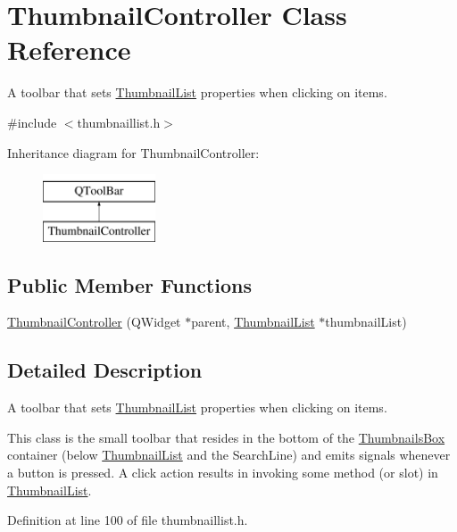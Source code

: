 \hypertarget{classThumbnailController}{\section{Thumbnail\+Controller Class Reference}
\label{classThumbnailController}
}


A toolbar that sets \hyperlink{classThumbnailList}{Thumbnail\+List} properties when clicking on items.  




{\ttfamily \#include $<$thumbnaillist.\+h$>$}

Inheritance diagram for Thumbnail\+Controller\+:\begin{figure}[H]
\begin{center}
\leavevmode
\includegraphics[height=2.000000cm]{classThumbnailController}
\end{center}
\end{figure}
\subsection*{Public Member Functions}
\begin{DoxyCompactItemize}
\item 
\hyperlink{classThumbnailController_a3e7a753f6d179134aaa9897371f95d12}{Thumbnail\+Controller} (Q\+Widget $\ast$parent, \hyperlink{classThumbnailList}{Thumbnail\+List} $\ast$thumbnail\+List)
\end{DoxyCompactItemize}


\subsection{Detailed Description}
A toolbar that sets \hyperlink{classThumbnailList}{Thumbnail\+List} properties when clicking on items. 

This class is the small toolbar that resides in the bottom of the \hyperlink{classThumbnailsBox}{Thumbnails\+Box} container (below \hyperlink{classThumbnailList}{Thumbnail\+List} and the Search\+Line) and emits signals whenever a button is pressed. A click action results in invoking some method (or slot) in \hyperlink{classThumbnailList}{Thumbnail\+List}. 

Definition at line 100 of file thumbnaillist.\+h.



